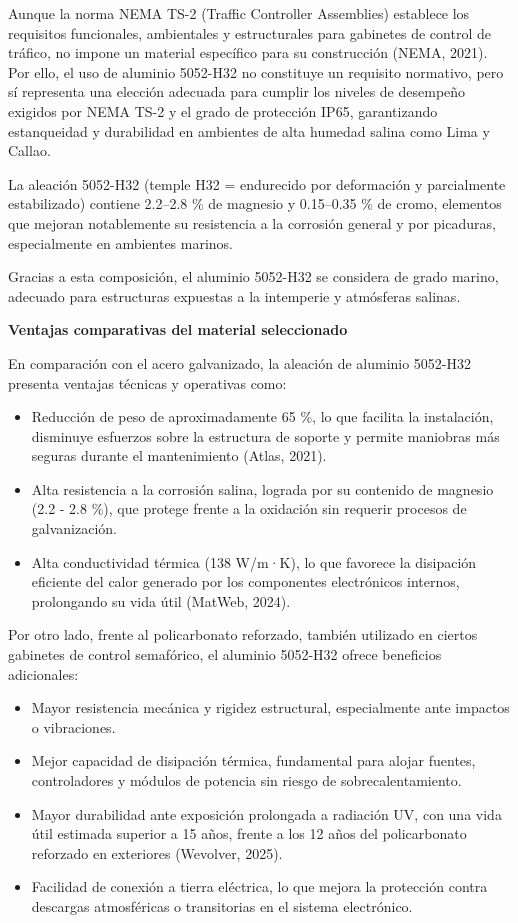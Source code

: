 \documentclass[12pt,a4paper,oneside]{report}
\begin{document}
Aunque la norma NEMA TS-2 (Traffic Controller Assemblies) establece los requisitos funcionales, ambientales y estructurales para gabinetes de control de tráfico, no impone un material específico para su construcción (NEMA, 2021). Por ello, el uso de aluminio 5052-H32 no constituye un requisito normativo, pero sí representa una elección adecuada para cumplir los niveles de desempeño exigidos por NEMA TS-2 y el grado de protección IP65, garantizando estanqueidad y durabilidad en ambientes de alta humedad salina como Lima y Callao.

La aleación 5052-H32 (temple H32 = endurecido por deformación y parcialmente estabilizado) contiene 2.2--2.8 \% de magnesio y 0.15--0.35 \% de cromo, elementos que mejoran notablemente su resistencia a la corrosión general y por picaduras, especialmente en ambientes marinos.

Gracias a esta composición, el aluminio 5052-H32 se considera de grado marino, adecuado para estructuras expuestas a la intemperie y atmósferas salinas.

\textbf{Ventajas comparativas del material seleccionado}

En comparación con el acero galvanizado, la aleación de aluminio 5052-H32 presenta ventajas técnicas y operativas como:

\begin{itemize}
\item
  Reducción de peso de aproximadamente 65 \%, lo que facilita la instalación, disminuye esfuerzos sobre la estructura de soporte y permite maniobras más seguras durante el mantenimiento (Atlas, 2021).
\item
  Alta resistencia a la corrosión salina, lograda por su contenido de magnesio (2.2 - 2.8 \%), que protege frente a la oxidación sin requerir procesos de galvanización.
\item
  Alta conductividad térmica (138 W/m·K), lo que favorece la disipación eficiente del calor generado por los componentes electrónicos internos, prolongando su vida útil (MatWeb, 2024).
\end{itemize}

Por otro lado, frente al policarbonato reforzado, también utilizado en ciertos gabinetes de control semafórico, el aluminio 5052-H32 ofrece beneficios adicionales:

\begin{itemize}
\item
  Mayor resistencia mecánica y rigidez estructural, especialmente ante impactos o vibraciones.
\item
  Mejor capacidad de disipación térmica, fundamental para alojar fuentes, controladores y módulos de potencia sin riesgo de sobrecalentamiento.
\item
  Mayor durabilidad ante exposición prolongada a radiación UV, con una vida útil estimada superior a 15 años, frente a los 12 años del policarbonato reforzado en exteriores (Wevolver, 2025).
\item
  Facilidad de conexión a tierra eléctrica, lo que mejora la protección contra descargas atmosféricas o transitorias en el sistema electrónico.
\end{itemize}
\end{document}
